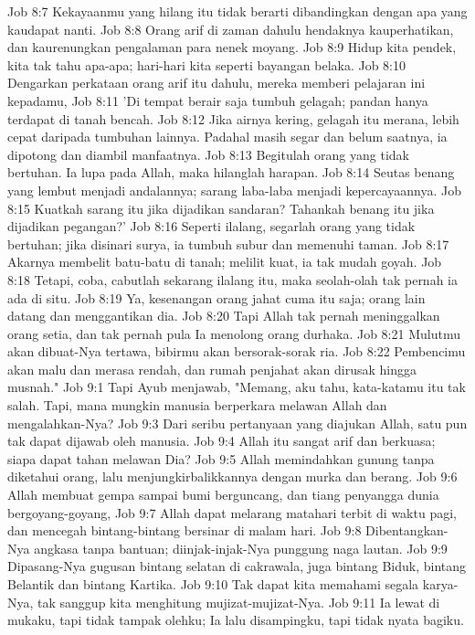 Job 8:7  Kekayaanmu yang hilang itu tidak berarti dibandingkan dengan apa yang kaudapat nanti.
Job 8:8  Orang arif di zaman dahulu hendaknya kauperhatikan, dan kaurenungkan pengalaman para nenek moyang.
Job 8:9  Hidup kita pendek, kita tak tahu apa-apa; hari-hari kita seperti bayangan belaka.
Job 8:10  Dengarkan perkataan orang arif itu dahulu, mereka memberi pelajaran ini kepadamu,
Job 8:11  'Di tempat berair saja tumbuh gelagah; pandan hanya terdapat di tanah bencah.
Job 8:12  Jika airnya kering, gelagah itu merana, lebih cepat daripada tumbuhan lainnya. Padahal masih segar dan belum saatnya, ia dipotong dan diambil manfaatnya.
Job 8:13  Begitulah orang yang tidak bertuhan. Ia lupa pada Allah, maka hilanglah harapan.
Job 8:14  Seutas benang yang lembut menjadi andalannya; sarang laba-laba menjadi kepercayaannya.
Job 8:15  Kuatkah sarang itu jika dijadikan sandaran? Tahankah benang itu jika dijadikan pegangan?'
Job 8:16  Seperti ilalang, segarlah orang yang tidak bertuhan; jika disinari surya, ia tumbuh subur dan memenuhi taman.
Job 8:17  Akarnya membelit batu-batu di tanah; melilit kuat, ia tak mudah goyah.
Job 8:18  Tetapi, coba, cabutlah sekarang ilalang itu, maka seolah-olah tak pernah ia ada di situ.
Job 8:19  Ya, kesenangan orang jahat cuma itu saja; orang lain datang dan menggantikan dia.
Job 8:20  Tapi Allah tak pernah meninggalkan orang setia, dan tak pernah pula Ia menolong orang durhaka.
Job 8:21  Mulutmu akan dibuat-Nya tertawa, bibirmu akan bersorak-sorak ria.
Job 8:22  Pembencimu akan malu dan merasa rendah, dan rumah penjahat akan dirusak hingga musnah."
Job 9:1  Tapi Ayub menjawab, "Memang, aku tahu, kata-katamu itu tak salah. Tapi, mana mungkin manusia berperkara melawan Allah dan mengalahkan-Nya?
Job 9:3  Dari seribu pertanyaan yang diajukan Allah, satu pun tak dapat dijawab oleh manusia.
Job 9:4  Allah itu sangat arif dan berkuasa; siapa dapat tahan melawan Dia?
Job 9:5  Allah memindahkan gunung tanpa diketahui orang, lalu menjungkirbalikkannya dengan murka dan berang.
Job 9:6  Allah membuat gempa sampai bumi berguncang, dan tiang penyangga dunia bergoyang-goyang,
Job 9:7  Allah dapat melarang matahari terbit di waktu pagi, dan mencegah bintang-bintang bersinar di malam hari.
Job 9:8  Dibentangkan-Nya angkasa tanpa bantuan; diinjak-injak-Nya punggung naga lautan.
Job 9:9  Dipasang-Nya gugusan bintang selatan di cakrawala, juga bintang Biduk, bintang Belantik dan bintang Kartika.
Job 9:10  Tak dapat kita memahami segala karya-Nya, tak sanggup kita menghitung mujizat-mujizat-Nya.
Job 9:11  Ia lewat di mukaku, tapi tidak tampak olehku; Ia lalu disampingku, tapi tidak nyata bagiku.
